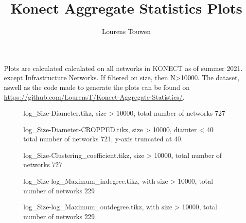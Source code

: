 \documentclass[fleqn]{article}
\title{Konect Aggregate Statistics Plots}
\author{Lourens Touwen}
\begin{document}
	
	\pagestyle{plain}
	
	\maketitle
	
	\newlength\fheight 
	\newlength\fwidth 
	\setlength{} 
	\setlength{}
	
	
	Plots are calculated calculated on all networks in KONECT as of summer 2021. except Infrastructure Networks. If filtered on size, then N>10000. The dataset, aswell as the code made to generate the plots can be found on \url{https://github.com/LourensT/Konect-Aggregate-Statistics/}.
	
	\begin{figure}[!htb]
		\centering
		
		\caption{log\_Size-Diameter.tikz, size > 10000, total number of networks 727}
	\end{figure}

	\begin{figure}[!htb]
		\centering
		
		\caption{log\_Size-Diameter-CROPPED.tikz, size > 10000, diamter < 40 total number of networks 721, y-axis truncated at 40.}
	\end{figure}

	\begin{figure}[!htb]
		\centering
		
		\caption{log\_Size-Clustering\_coefficient.tikz, size > 10000, total number of networks 727}
	\end{figure}
	
	\begin{figure}[!htb]
		\centering
		
		\caption{log\_Size-log\_Maximum\_indegree.tikz, with size > 10000, total number of networks 229}
	\end{figure}	

	\begin{figure}[!htb]
		\centering
		
		\caption{log\_Size-log\_Maximum\_outdegree.tikz, with size > 10000, total number of networks 229}
	\end{figure}	
\end{document}
